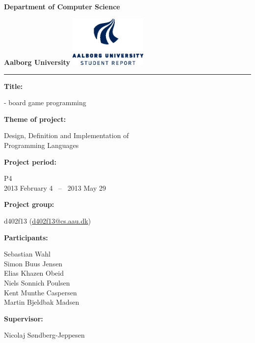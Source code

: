 \begin{nopagebreak}
  \begin{minipage}{\textwidth}
    \vspace{2cm}
    \LARGE{\textbf{Department of Computer Science}}\vspace{-2.1cm}

    \large{\textbf{Aalborg University}}
    \hspace{8.30cm}\includegraphics[height=2.5cm]{pictures/aau_logo_en_blue.eps}
  \end{minipage}
  \vspace{0.1cm}
  \hrule

  \newcommand{\titleitem}[2]{\textbf{#1:}

  \hspace*{0.5cm}
  \begin{minipage}{0.9\columnwidth}#2\end{minipage}
  \vspace{0.25cm}}
  \begin{multicols}{2}

    \titleitem{Title}{\productname{} - board game programming}

    \titleitem{Theme of project}{Design, Definition and Implementation of \\Programming Languages}

    \titleitem{Project period}{P4\\2013 February 4 ~--~ 2013 May 29}

    \titleitem{Project group}{d402f13 (\url{d402f13@cs.aau.dk})}

    \titleitem{Participants}{
      Sebastian Wahl\\
      Simon Buus Jensen\\
      Elias Khazen Obeid\\
      Niels Sonnich Poulsen\\
      Kent Munthe Caspersen\\
      Martin Bjeldbak Madsen
    }

    \titleitem{Supervisor}{Nicolaj Søndberg-Jeppesen}


\end{multicols}
\end{nopagebreak}

